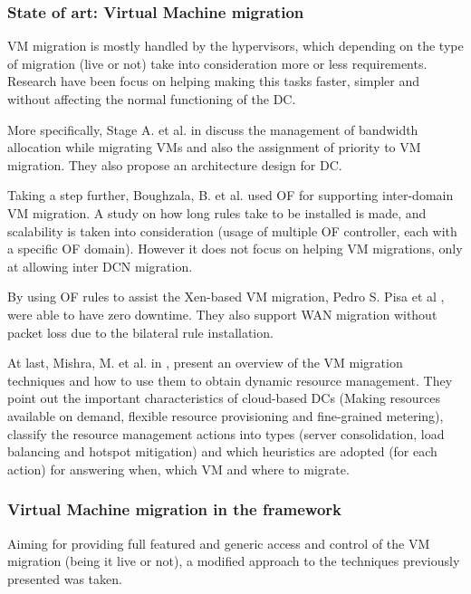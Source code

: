\documentclass[12pt,english,oneside]{book}
\begin{document}
\subsubsection{State of art: Virtual Machine migration}
\hspace{0.6cm}

VM migration is mostly handled by the hypervisors, which depending on the type of migration (live or not) take into consideration more or less requirements.
Research have been focus on helping making this tasks faster, simpler and without affecting the normal functioning of the DC.

More specifically, Stage A. et al. in \cite{vmmig1} discuss the management of bandwidth allocation while migrating VMs and also the assignment of priority to VM migration. They also propose an architecture design for DC.

Taking a step further, Boughzala, B. et al. \cite{vmmig2} used OF for supporting inter-domain VM migration. A study on how long rules take to be installed is made, and scalability is taken into consideration (usage of multiple OF controller, each with a specific OF domain). However it does not focus on helping VM migrations, only at allowing inter DCN migration.

By using OF rules to assist the Xen-based VM migration, Pedro S. Pisa et al \cite{vmmig3}, were able to have zero downtime. They also support WAN migration without packet loss due to the bilateral rule installation.

At last, Mishra, M. et al. in \cite{vmmig4}, present an overview of the VM migration techniques and how to use them to obtain dynamic resource management.
They point out the important characteristics of cloud-based DCs (Making resources available on demand, flexible resource provisioning and fine-grained metering), classify the resource management actions into types (server consolidation, load balancing and hotspot mitigation) and which heuristics are adopted (for each action) for answering when, which VM and where to migrate.

\subsubsection{Virtual Machine migration in the framework}
\hspace{0.6cm}

Aiming for providing full featured and generic access and control of the VM migration (being it live or not), a modified approach to the techniques previously presented was taken.
\end{document}
